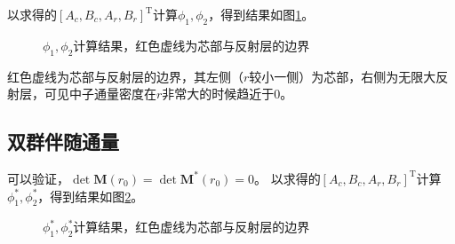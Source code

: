 以求得的$\left[A_c,B_c,A_r,B_r\right]^{\mathrm{T}}$计算$\phi_1,\phi_2$，得到结果如图\ref{fig:flux_r}。

\begin{figure}[H]
    \centering
    
    \caption{$\phi_1,\phi_2$计算结果，红色虚线为芯部与反射层的边界}
    \label{fig:flux_r}
\end{figure}

红色虚线为芯部与反射层的边界，其左侧（$r$较小一侧）为芯部，右侧为无限大反射层，可见中子通量密度在$r$非常大的时候趋近于$0$。

\subsection{双群伴随通量}

可以验证，$\det \pmb{M}(r_0)=\det \pmb{M}^*(r_0)=0$。
以求得的$\left[A_c,B_c,A_r,B_r\right]^{\mathrm{T}}$计算$\phi_1^*,\phi_2^*$，得到结果如图\ref{fig:flux_r_adjoint}。

\begin{figure}[H]
    \centering
    
    \caption{$\phi_1^*,\phi_2^*$计算结果，红色虚线为芯部与反射层的边界}
    \label{fig:flux_r_adjoint}
\end{figure}
